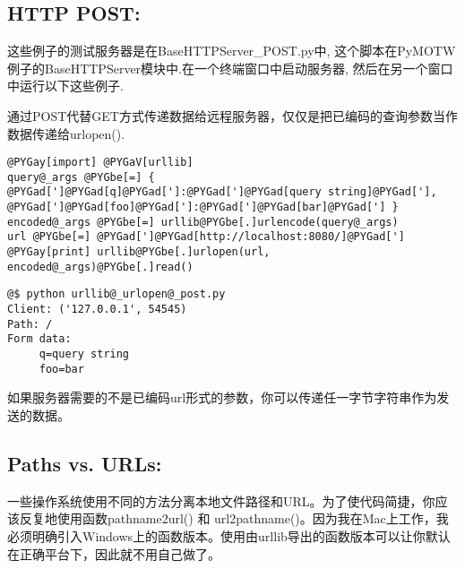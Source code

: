 \documentclass[a4paper,10pt,english]{manual}
\begin{document}
\subsection{HTTP POST:}

这些例子的测试服务器是在BaseHTTPServer\_POST.py中, 这个脚本在PyMOTW例子的BaseHTTPServer模块中.在一个终端窗口中启动服务器, 然后在另一个窗口中运行以下这些例子.

通过POST代替GET方式传递数据给远程服务器，仅仅是把已编码的查询参数当作数据传递给urlopen().

\begin{Verbatim}[commandchars=@\[\]]
@PYGay[import] @PYGaV[urllib]
query@_args @PYGbe[=] { @PYGad[']@PYGad[q]@PYGad[']:@PYGad[']@PYGad[query string]@PYGad['], @PYGad[']@PYGad[foo]@PYGad[']:@PYGad[']@PYGad[bar]@PYGad['] }
encoded@_args @PYGbe[=] urllib@PYGbe[.]urlencode(query@_args)
url @PYGbe[=] @PYGad[']@PYGad[http://localhost:8080/]@PYGad[']
@PYGay[print] urllib@PYGbe[.]urlopen(url, encoded@_args)@PYGbe[.]read()
\end{Verbatim}

\begin{Verbatim}[commandchars=@\[\]]
@$ python urllib@_urlopen@_post.py
Client: ('127.0.0.1', 54545)
Path: /
Form data:
     q=query string
     foo=bar
\end{Verbatim}

如果服务器需要的不是已编码url形式的参数，你可以传递任一字节字符串作为发送的数据。


\subsection{Paths vs. URLs:}

一些操作系统使用不同的方法分离本地文件路径和URL。为了使代码简捷，你应该反复地使用函数pathname2url() 和 url2pathname()。因为我在Mac上工作，我必须明确引入Windows上的函数版本。使用由urllib导出的函数版本可以让你默认在正确平台下，因此就不用自己做了。
\end{document}
